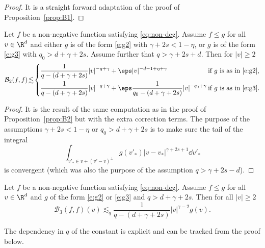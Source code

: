 \begin{proof} It is a straight forward adaptation of the proof of Proposition~\ref{prop:B1}.
\end{proof}

\begin{prop} \label{prop:B2-2} Let $f$ be a non-negative function satisfying \eqref{eq:non-deg}. Assume $f \leq g$ for all $v \in \R^d$ and
either $g$ is of the form \eqref{e:g2} with $\gamma+2s < 1-\eta$, or
$g$ is of the form \eqref{e:g3} with $q_0 > d+\gamma+2s$. Assume
further that $q> \gamma +2s +d$. Then for $|v| \ge 2$
\[
\mathcal{B}_2 (f,f) \!\lesssim\! \begin{cases}\displaystyle
\frac 1 {q-(d+\gamma + 2s)} |v|^{-q+\gamma} + \eps
|v|^{-d-1+\eta +\gamma}
& \hspace*{-8pt}\text{if $g$ is as in \eqref{e:g2}}, \\[3mm] \displaystyle
\frac 1 {q-(d+\gamma + 2s)} |v|^{-q+\gamma} + \eps \frac 1
{q_0-(d+\gamma + 2s)} |v|^{-q_0 +\gamma}
& \hspace*{-8pt}\text{if $g$ is as
in \eqref{e:g3}}.
\end{cases}
\]
\end{prop}

\begin{proof}
It is the result of the same computation as in the proof of
Proposition~\ref{prop:B2} but with the extra correction terms. The
purpose of the assumptions $\gamma+2s < 1-\eta$ or
$q_0 > d+\gamma+2s$ is to make sure the tail of the integral
\[ \int_{v'_* \in v + (v'-v)^\bot} g(v'_*) |v-v_*|^{\gamma+2s +1}
\dd v'_*\] is convergent (which was also the purpose of the
assumption $q > \gamma+2s-d$).
\end{proof}

\begin{prop} \label{prop:B3-2} Let $f$ be a non-negative function satisfying \eqref{eq:non-deg}. Assume $f \leq g$ for all $v \in \R^d$ and
$g$ of the form \eqref{e:g2} or \eqref{e:g3} and $q> d+\gamma
+2s$. Then for all $|v| \ge 2$
\[ \mathcal{B}_3 (f,f)(v) \lesssim_q \frac{1}{q-(d+\gamma+2s)} |v|^{\gamma -2} g(v).\]
\end{prop}
\begin{remark}
The dependency in $q$ of the constant is explicit and can be
tracked from the proof below.
\end{remark}

